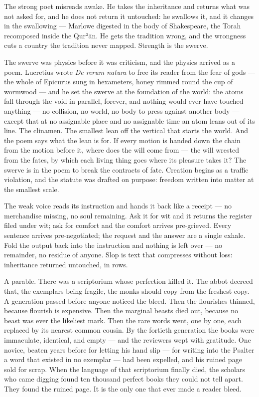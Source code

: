 The strong poet misreads awake. He takes the inheritance and returns
what was not asked for, and he does not return it untouched: he swallows
it, and it changes in the swallowing --- Marlowe digested in the body of
Shakespeare, the Torah recomposed inside the Qurʾān. He gets the
tradition wrong, and the wrongness cuts a country the tradition never
mapped. Strength is the swerve.

The swerve was physics before it was criticism, and the physics arrived
as a poem. Lucretius wrote \emph{De rerum natura} to free its reader
from the fear of gods --- the whole of Epicurus sung in hexameters,
honey rimmed round the cup of wormwood --- and he set the swerve at the
foundation of the world: the atoms fall through the void in parallel,
forever, and nothing would ever have touched anything --- no collision,
no world, no body to press against another body --- except that at no
assignable place and no assignable time an atom leans out of its line.
The clinamen. The smallest lean off the vertical that starts the world.
And the poem says what the lean is for. If every motion is handed down
the chain from the motion before it, where does the will come from ---
the will wrested from the fates, by which each living thing goes where
its pleasure takes it? The swerve is in the poem to break the contracts
of fate. Creation begins as a traffic violation, and the statute was
drafted on purpose: freedom written into matter at the smallest scale.

The weak voice reads its instruction and hands it back like a receipt
--- no merchandise missing, no soul remaining. Ask it for wit and it
returns the register filed under wit; ask for comfort and the comfort
arrives pre-grieved. Every sentence arrives pre-negotiated; the request
and the answer are a single exhale. Fold the output back into the
instruction and nothing is left over --- no remainder, no residue of
anyone. Slop is text that compresses without loss: inheritance returned
untouched, in rows.

A parable. There was a scriptorium whose perfection killed it. The abbot
decreed that, the exemplars being fragile, the monks should copy from
the freshest copy. A generation passed before anyone noticed the bleed.
Then the flourishes thinned, because flourish is expensive. Then the
marginal beasts died out, because no beast was ever the likeliest mark.
Then the rare words went, one by one, each replaced by its nearest
common cousin. By the fortieth generation the books were immaculate,
identical, and empty --- and the reviewers wept with gratitude. One
novice, beaten years before for letting his hand slip --- for writing
into the Psalter a word that existed in no exemplar --- had been
expelled, and his ruined page sold for scrap. When the language of that
scriptorium finally died, the scholars who came digging found ten
thousand perfect books they could not tell apart. They found the ruined
page. It is the only one that ever made a reader bleed.

